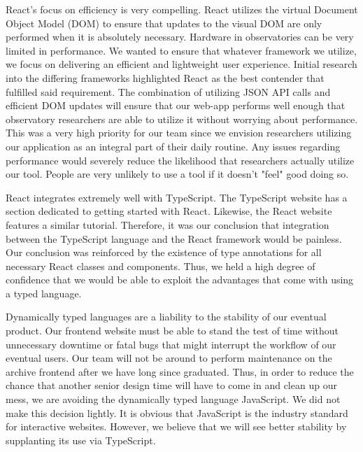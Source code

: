 \documentclass[12pt]{report}
\begin{document}
React's focus on efficiency is very compelling. React utilizes the virtual Document Object Model (DOM) to ensure that updates to the visual DOM are only performed when it is absolutely necessary. Hardware in observatories can be very limited in performance. We wanted to ensure that whatever framework we utilize, we focus on delivering an efficient and lightweight user experience. Initial research into the differing frameworks highlighted React as the best contender that fulfilled said requirement. The combination of utilizing JSON API calls and efficient DOM updates will ensure that our web-app performs well enough that observatory researchers are able to utilize it without worrying about performance. This was a very high priority for our team since we envision researchers utilizing our application as an integral part of their daily routine. Any issues regarding performance would severely reduce the likelihood that researchers actually utilize our tool. People are very unlikely to use a tool if it doesn't "feel" good doing so.

React integrates extremely well with TypeScript. The TypeScript website has a section dedicated to getting started with React.\cite{typescriptreacttutorial} Likewise, the React website features a similar tutorial.\cite{reacttypescripttutorial} Therefore, it was our conclusion that integration between the TypeScript language and the React framework would be painless. Our conclusion was reinforced by the existence of type annotations for all necessary React classes and components. Thus, we held a high degree of confidence that we would be able to exploit the advantages that come with using a typed language.

Dynamically typed languages are a liability to the stability of our eventual product. Our frontend website must be able to stand the test of time without unnecessary downtime or fatal bugs that might interrupt the workflow of our eventual users. Our team will not be around to perform maintenance on the archive frontend after we have long since graduated. Thus, in order to reduce the chance that another senior design time will have to come in and clean up our mess, we are avoiding the dynamically typed language JavaScript. We did not make this decision lightly. It is obvious that JavaScript is the industry standard for interactive websites. However, we believe that we will see better stability by supplanting its use via TypeScript.
\end{document}
